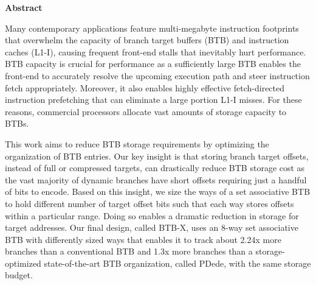 \documentclass[../../../main.tex]{subfiles}
\begin{document}
\begin{center}
  \textbf{Abstract}
  \end{center}
\begin{changemargin}{0.75cm}{0.75cm}
Many contemporary applications feature multi-megabyte instruction footprints that overwhelm the capacity of branch target buffers (BTB) and instruction caches (L1-I), causing frequent front-end stalls that inevitably hurt performance. BTB capacity is crucial for performance as a sufficiently large BTB enables the front-end to accurately resolve the upcoming execution path and steer instruction fetch appropriately. Moreover, it also enables highly effective fetch-directed instruction prefetching that can eliminate a large portion L1-I misses. For these reasons, commercial processors allocate vast amounts of storage capacity to BTBs.

This work aims to reduce BTB storage requirements by optimizing the organization of BTB entries. Our key insight is that storing branch target offsets, instead of full or compressed targets, can drastically reduce BTB storage cost as the vast majority of dynamic branches have short offsets requiring just a handful of bits to encode. Based on this insight, we size the ways of a set associative BTB to hold different number of target offset bits such that each way stores offsets within a particular range. Doing so enables a dramatic reduction in storage for target addresses. Our final design, called BTB-X, uses an 8-way set associative BTB with differently sized ways that enables it to track about 2.24x more branches than a conventional BTB and 1.3x more branches than a storage-optimized state-of-the-art BTB organization, called PDede, with the same storage budget.
\end{changemargin}

\vspace{1cm}

\begin{refsection}
  
  \printbibliography[heading=refs]

  \begin{subappendices}
    
  \end{subappendices}

\end{refsection}
\FloatBarrier
\end{document}
